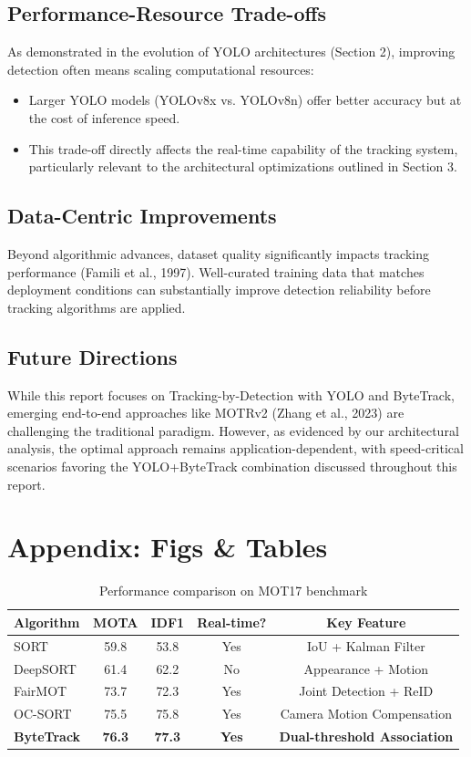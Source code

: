 \documentclass[11pt]{article}
\begin{document}
\subsection{Performance-Resource Trade-offs}
As demonstrated in the evolution of YOLO architectures (Section 2), improving detection often means scaling computational resources:

\begin{itemize}
    \item Larger YOLO models (YOLOv8x vs. YOLOv8n) offer better accuracy but at the cost of inference speed.
    \item This trade-off directly affects the real-time capability of the tracking system, particularly relevant to the architectural optimizations outlined in Section 3.
\end{itemize}

\subsection{Data-Centric Improvements}
Beyond algorithmic advances, dataset quality significantly impacts tracking performance (Famili et al., 1997). Well-curated training data that matches deployment conditions can substantially improve detection reliability before tracking algorithms are applied.

\subsection{Future Directions}
While this report focuses on Tracking-by-Detection with YOLO and ByteTrack, emerging end-to-end approaches like MOTRv2 (Zhang et al., 2023) are challenging the traditional paradigm. However, as evidenced by our architectural analysis, the optimal approach remains application-dependent, with speed-critical scenarios favoring the YOLO+ByteTrack combination discussed throughout this report.

\newpage
\section{Appendix: Figs \& Tables}
\begin{table}[h]
    \centering
    \begin{tabular}{|l|c|c|c|c|}
        \hline
        \textbf{Algorithm} & \textbf{MOTA} & \textbf{IDF1} & \textbf{Real-time?} & \textbf{Key Feature} \\
        \hline
        SORT & 59.8 & 53.8 & Yes & IoU + Kalman Filter \\
        DeepSORT & 61.4 & 62.2 & No & Appearance + Motion \\
        FairMOT & 73.7 & 72.3 & Yes & Joint Detection + ReID \\
        OC-SORT & 75.5 & 75.8 & Yes & Camera Motion Compensation \\
        \textbf{ByteTrack} & \textbf{76.3} & \textbf{77.3} & \textbf{Yes} & \textbf{Dual-threshold Association} \\
        \hline
    \end{tabular}
    \label{tab:mot17_results}
    \caption{Performance comparison on MOT17 benchmark}
\end{table}
\end{document}
